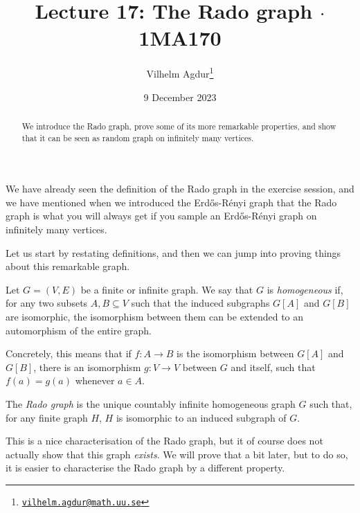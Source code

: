 \documentclass[nobib]{tufte-handout}
\title{Lecture 17: The Rado graph $\cdot$ 1MA170}
\author[Vilhelm Agdur]{Vilhelm Agdur\thanks{\href{mailto:vilhelm.agdur@math.uu.se}{\nolinkurl{vilhelm.agdur@math.uu.se}}}}
\date{9 December 2023}
\begin{document}
\maketitle%

\begin{abstract}
\noindent
We introduce the Rado graph, prove some of its more remarkable properties, and show that it can be seen as  random graph on infinitely many vertices.
\end{abstract}

We have already seen the definition of the Rado graph in the exercise session, and we have mentioned when we introduced the Erd\H{o}s-Rényi graph that the Rado graph is what you will always get if you sample an Erd\H{o}s-Rényi graph on infinitely many vertices.

Let us start by restating definitions, and then we can jump into proving things about this remarkable graph.

\begin{definition}
    Let $G = (V,E)$ be a finite or infinite graph. We say that $G$ is \emph{homogeneous} if, for any two subsets $A, B \subseteq V$ such that the induced subgraphs $G[A]$ and $G[B]$ are isomorphic, the isomorphism between them can be extended to an automorphism of the entire graph.
  
    Concretely, this means that if $f: A \to B$ is the isomorphism between $G[A]$ and $G[B]$, there is an isomorphism $g: V \to V$ between $G$ and itself, such that $f(a) = g(a)$ whenever $a \in A$.
\end{definition}

\begin{definition}
    The \emph{Rado graph} is the unique countably infinite homogeneous graph $G$ such that, for any finite graph $H$, $H$ is isomorphic to an induced subgraph of $G$.
\end{definition}

This is a nice characterisation of the Rado graph, but it of course does not actually show that this graph \emph{exists}. We will prove that a bit later, but to do so, it is easier to characterise the Rado graph by a different property.
\end{document}
